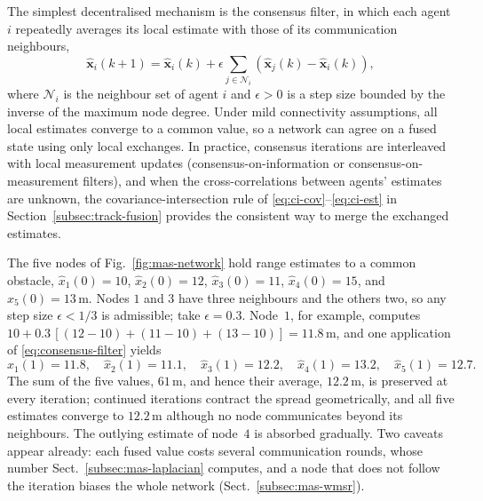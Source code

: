 \documentclass[graybox,envcountchap]{style/SNmono}
\begin{document}
The simplest decentralised mechanism is the consensus filter, in which each agent $i$ repeatedly averages its local estimate with those of its communication neighbours,
\begin{equation}
\widehat{\mathbf{x}}_i(k+1)=\widehat{\mathbf{x}}_i(k)+\epsilon\sum_{j\in\mathcal{N}_i}\left(\widehat{\mathbf{x}}_j(k)-\widehat{\mathbf{x}}_i(k)\right),
\label{eq:consensus-filter}
\end{equation}
where $\mathcal{N}_i$ is the neighbour set of agent $i$ and $\epsilon>0$ is a step size bounded by the inverse of the maximum node degree. Under mild connectivity assumptions, all local estimates converge to a common value, so a network can agree on a fused state using only local exchanges. In practice, consensus iterations are interleaved with local measurement updates (consensus-on-information or consensus-on-measurement filters), and when the cross-correlations between agents' estimates are unknown, the covariance-intersection rule of \eqref{eq:ci-cov}--\eqref{eq:ci-est} in Section~\ref{subsec:track-fusion} provides the consistent way to merge the exchanged estimates.



\begin{example}
\label{ex:mas-network-consensus}
The five nodes of Fig.~\ref{fig:mas-network} hold range estimates to a common obstacle, $\widehat{x}_1(0)=10$, $\widehat{x}_2(0)=12$, $\widehat{x}_3(0)=11$, $\widehat{x}_4(0)=15$, and $\widehat{x}_5(0)=13$\,m. Nodes $1$ and $3$ have three neighbours and the others two, so any step size $\epsilon<1/3$ is admissible; take $\epsilon=0.3$. Node~$1$, for example, computes $10+0.3\,[(12-10)+(11-10)+(13-10)]=11.8$\,m, and one application of \eqref{eq:consensus-filter} yields
\begin{equation*}
\widehat{x}_1(1)=11.8,\quad \widehat{x}_2(1)=11.1,\quad \widehat{x}_3(1)=12.2,\quad \widehat{x}_4(1)=13.2,\quad \widehat{x}_5(1)=12.7 .
\end{equation*}
The sum of the five values, $61$\,m, and hence their average, $12.2$\,m, is preserved at every iteration; continued iterations contract the spread geometrically, and all five estimates converge to $12.2$\,m although no node communicates beyond its neighbours. The outlying estimate of node~$4$ is absorbed gradually. Two caveats appear already: each fused value costs several communication rounds, whose number Sect.~\ref{subsec:mas-laplacian} computes, and a node that does not follow the iteration biases the whole network (Sect.~\ref{subsec:mas-wmsr}).
\end{example}
\end{document}
